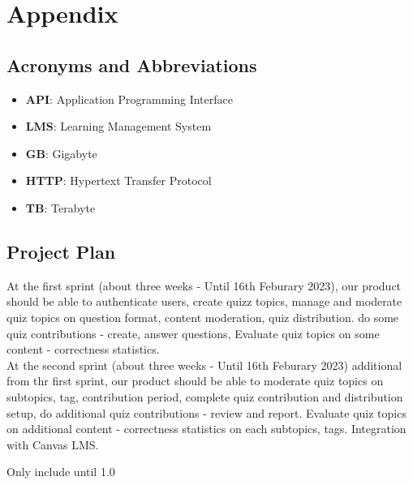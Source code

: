 \documentclass[ 10pt]{report}
\begin{document}

    \chapter{Appendix}
        \section{Acronyms and Abbreviations}
        \begin{itemize}
            \item \textbf{API}: Application Programming Interface
            \item \textbf{LMS}: Learning Management System
            \item \textbf{GB}: Gigabyte
            \item \textbf{HTTP}: Hypertext Transfer Protocol
            \item \textbf{TB}: Terabyte
        \end{itemize}


        \section{Project Plan}
        At the first sprint (about three weeks - Until 16th Feburary 2023), our product should be able to authenticate users, create quizz topics, manage and moderate quiz topics on question format, content moderation, quiz distribution. do some quiz contributions - create, answer questions,  Evaluate quiz topics on some content - correctness statistics. \\
        \indent At the second sprint (about three weeks - Until 16th Feburary 2023) additional from thr first sprint, our product should be able to moderate quiz topics on subtopics, tag, contribution period, complete quiz contribution and distribution setup, do additional quiz contributions - review and report.  Evaluate quiz topics on additional content - correctness statistics on each subtopics, tags. Integration with Canvas LMS. \\
        \pagebreak

        Only include until 1.0
\end{document}
